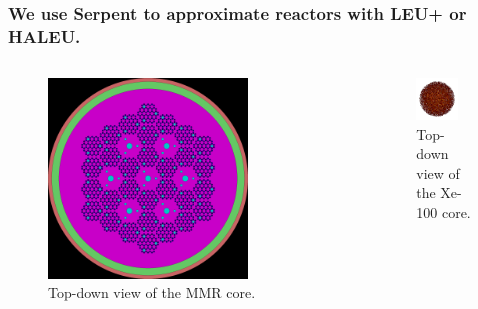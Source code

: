 \documentclass[9pt]{beamer}
\begin{document}
  \begin{frame}
    \frametitle{We use Serpent to approximate reactors with LEU+ or HALEU.}
    \begin{columns}
      \column[t]{5cm}
      \begin{figure}
        \centering
        \includegraphics[width=0.75\textwidth]{images/haleu_mmr_2blocks.inp_geom1.png}
        \caption{Top-down view of the MMR core.}
        \label{fig:td_mmr}
      \end{figure}

      \column[t]{5cm}
      \begin{figure}[htbp!]
        \begin{center}
          \includegraphics[width=0.75\textwidth]{images/htgr-mr-burn-200.inp_mesh1_bstep6.png}
        \end{center}
        \caption{Top-down view of the Xe-100 core.}
        \label{fig:td_xe100}
      \end{figure}
    \end{columns}
  \end{frame}
\end{document}

